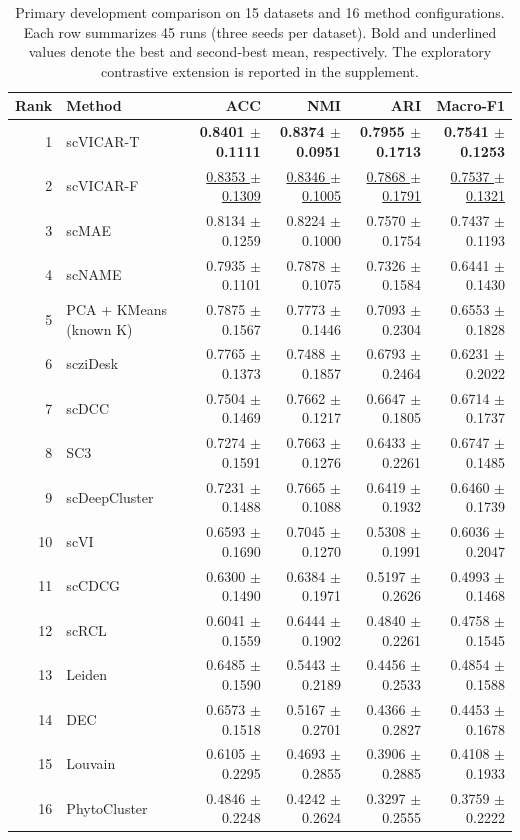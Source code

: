 \begin{table}[t]
\centering
\scriptsize
\setlength{\tabcolsep}{4pt}
\caption{Primary development comparison on 15 datasets and 16 method configurations. Each row summarizes 45 runs (three seeds per dataset). Bold and underlined values denote the best and second-best mean, respectively. The exploratory contrastive extension is reported in the supplement.}
\label{tab:development-benchmark}
\begin{tabular}{rlrrrr}
\toprule
Rank & Method & ACC & NMI & ARI & Macro-F1 \\
\midrule
1 & scVICAR-T & \textbf{0.8401 $\pm$ 0.1111} & \textbf{0.8374 $\pm$ 0.0951} & \textbf{0.7955 $\pm$ 0.1713} & \textbf{0.7541 $\pm$ 0.1253} \\
2 & scVICAR-F & \underline{0.8353 $\pm$ 0.1309} & \underline{0.8346 $\pm$ 0.1005} & \underline{0.7868 $\pm$ 0.1791} & \underline{0.7537 $\pm$ 0.1321} \\
3 & scMAE & 0.8134 $\pm$ 0.1259 & 0.8224 $\pm$ 0.1000 & 0.7570 $\pm$ 0.1754 & 0.7437 $\pm$ 0.1193 \\
4 & scNAME & 0.7935 $\pm$ 0.1101 & 0.7878 $\pm$ 0.1075 & 0.7326 $\pm$ 0.1584 & 0.6441 $\pm$ 0.1430 \\
5 & PCA + KMeans (known K) & 0.7875 $\pm$ 0.1567 & 0.7773 $\pm$ 0.1446 & 0.7093 $\pm$ 0.2304 & 0.6553 $\pm$ 0.1828 \\
6 & scziDesk & 0.7765 $\pm$ 0.1373 & 0.7488 $\pm$ 0.1857 & 0.6793 $\pm$ 0.2464 & 0.6231 $\pm$ 0.2022 \\
7 & scDCC & 0.7504 $\pm$ 0.1469 & 0.7662 $\pm$ 0.1217 & 0.6647 $\pm$ 0.1805 & 0.6714 $\pm$ 0.1737 \\
8 & SC3 & 0.7274 $\pm$ 0.1591 & 0.7663 $\pm$ 0.1276 & 0.6433 $\pm$ 0.2261 & 0.6747 $\pm$ 0.1485 \\
9 & scDeepCluster & 0.7231 $\pm$ 0.1488 & 0.7665 $\pm$ 0.1088 & 0.6419 $\pm$ 0.1932 & 0.6460 $\pm$ 0.1739 \\
10 & scVI & 0.6593 $\pm$ 0.1690 & 0.7045 $\pm$ 0.1270 & 0.5308 $\pm$ 0.1991 & 0.6036 $\pm$ 0.2047 \\
11 & scCDCG & 0.6300 $\pm$ 0.1490 & 0.6384 $\pm$ 0.1971 & 0.5197 $\pm$ 0.2626 & 0.4993 $\pm$ 0.1468 \\
12 & scRCL & 0.6041 $\pm$ 0.1559 & 0.6444 $\pm$ 0.1902 & 0.4840 $\pm$ 0.2261 & 0.4758 $\pm$ 0.1545 \\
13 & Leiden & 0.6485 $\pm$ 0.1590 & 0.5443 $\pm$ 0.2189 & 0.4456 $\pm$ 0.2533 & 0.4854 $\pm$ 0.1588 \\
14 & DEC & 0.6573 $\pm$ 0.1518 & 0.5167 $\pm$ 0.2701 & 0.4366 $\pm$ 0.2827 & 0.4453 $\pm$ 0.1678 \\
15 & Louvain & 0.6105 $\pm$ 0.2295 & 0.4693 $\pm$ 0.2855 & 0.3906 $\pm$ 0.2885 & 0.4108 $\pm$ 0.1933 \\
16 & PhytoCluster & 0.4846 $\pm$ 0.2248 & 0.4242 $\pm$ 0.2624 & 0.3297 $\pm$ 0.2555 & 0.3759 $\pm$ 0.2222 \\
\bottomrule
\end{tabular}
\end{table}
